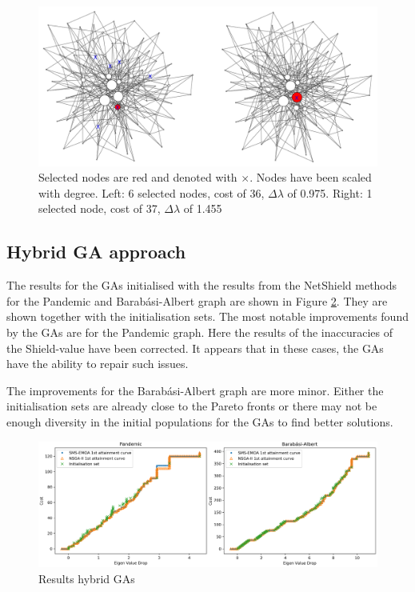 \documentclass{svproc}
\begin{document}

\begin{figure}
  \centering
    \includegraphics[width=\textwidth]{Images/j1}
    \caption{Selected nodes are red and denoted with $\times$. Nodes have been scaled with degree. Left: 6 selected nodes, cost of 36, $\Delta\lambda$ of 0.975.
            Right: 1 selected node, cost of 37, $\Delta\lambda$ of 1.455}
  \label{fig:bara_j1}
\end{figure}

\FloatBarrier

\subsection{Hybrid GA approach}

The results for the GAs initialised with the results from the NetShield methods for the Pandemic and Barab\'asi-Albert graph are shown in Figure \ref{fig:res_atins}. They are shown together with the initialisation sets. The most notable improvements found by the GAs are for the Pandemic graph. Here the results of the inaccuracies of the Shield-value have been corrected. It appears that in these cases, the GAs have the ability to repair such issues.

The improvements for the Barab\'asi-Albert graph are more minor. Either the initialisation sets are already close to the Pareto fronts or there may not be enough diversity in the initial populations for the GAs to find better solutions.

\begin{figure}
  \centering
    \includegraphics[width=\textwidth]{Images/pandbara_attainment_nsinit}
  \caption{Results hybrid GAs}
  \label{fig:res_atins}
\end{figure}
\end{document}
